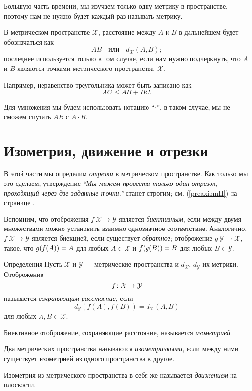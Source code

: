 Большую часть времени,
мы изучаем только одну метрику в пространстве,
поэтому нам не нужно будет каждый раз называть метрику.

В метрическом пространстве $\mathcal X$,
расстояние между $A$ и $B$ в дальнейшем будет обозначаться как 
$$AB
\quad
\text{или}
\quad
d_{\mathcal X}(A,B);$$
последнее используется только в том случае, если нам нужно подчеркнуть, что $A$ и $B$ являются точками метрического пространства~$\mathcal X$.

Например, неравенство треугольника может быть записано как
$$AC\le AB+BC.$$

Для умножения мы будем использовать нотацию ``$\cdot$'',
в таком случае, мы не сможем спутать $AB$ с $A\cdot B$.

\section*{Изометрия, движение и отрезки}

В этой части мы определим {}\emph{отрезки} в метрическом пространстве.
Как только мы это сделаем, утверждение {}\emph{``Мы можем провести только один отрезок, проходящий через две заданные точки.''} станет строгим; см. (\ref{preaxiomII}) на странице \pageref{preaxiomII}. 

Вспомним, что отоброжения $f\:\mathcal{X}\to\mathcal{Y}$
является \emph{биективным},
если между двумя множествами можно установить взаимно однозначное соответствие.
Аналогично, $f\:\mathcal{X}\to\mathcal{Y}$ является биекцией, если существует \emph{обратное};
отоброжение $g\:\mathcal{Y}\to\mathcal{X}$,
такое, что
$g(f(A))\z=A$ для любых $A\in\mathcal{X}$
и
$f(g(B))\z=B$ для любых $B\in\mathcal{Y}$. 

\begin{thm}{Определения}\label{def:isom}
Пусть $\mathcal X$ и $\mathcal Y$ — метрические пространства и $d_{\mathcal X}$, $d_{\mathcal Y}$ их метрики. 
Отоброжение
$$f\:\mathcal X \z\to \mathcal Y$$ 
называется \emph{сохраняющим расстояние}, если 
$$d_{\mathcal Y}(f(A), f(B))
 = d_{\mathcal X}(A,B)$$
для любых $A,B\in {\mathcal X}$.

Биективное отоброжение, сохраняющие расстояние, называется \emph{изометрией}. 

Два метрических пространства называются
\emph{изометричными}, если между ними существует изометрией из одного пространства в другое.

Изометрия из метрического пространства в себя же
называется \emph{движением} на плоскости.
\end{thm}

